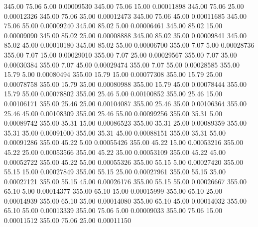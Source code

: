     345.00     75.06      5.00     0.00009530
    345.00     75.06     15.00     0.00011898
    345.00     75.06     25.00     0.00012326
    345.00     75.06     35.00     0.00012473
    345.00     75.06     45.00     0.00011685
    345.00     75.06     55.00     0.00009240
    345.00     85.02      5.00     0.00006461
    345.00     85.02     15.00     0.00009090
    345.00     85.02     25.00     0.00008888
    345.00     85.02     35.00     0.00009841
    345.00     85.02     45.00     0.00010180
    345.00     85.02     55.00     0.00006700
    355.00      7.07      5.00     0.00028736
    355.00      7.07     15.00     0.00029010
    355.00      7.07     25.00     0.00029567
    355.00      7.07     35.00     0.00030384
    355.00      7.07     45.00     0.00029474
    355.00      7.07     55.00     0.00028585
    355.00     15.79      5.00     0.00080494
    355.00     15.79     15.00     0.00077308
    355.00     15.79     25.00     0.00078758
    355.00     15.79     35.00     0.00080988
    355.00     15.79     45.00     0.00078444
    355.00     15.79     55.00     0.00078802
    355.00     25.46      5.00     0.00100852
    355.00     25.46     15.00     0.00106171
    355.00     25.46     25.00     0.00104087
    355.00     25.46     35.00     0.00106364
    355.00     25.46     45.00     0.00108309
    355.00     25.46     55.00     0.00099256
    355.00     35.31      5.00     0.00089742
    355.00     35.31     15.00     0.00086523
    355.00     35.31     25.00     0.00089359
    355.00     35.31     35.00     0.00091000
    355.00     35.31     45.00     0.00088151
    355.00     35.31     55.00     0.00091286
    355.00     45.22      5.00     0.00055426
    355.00     45.22     15.00     0.00053216
    355.00     45.22     25.00     0.00053566
    355.00     45.22     35.00     0.00053109
    355.00     45.22     45.00     0.00052722
    355.00     45.22     55.00     0.00055326
    355.00     55.15      5.00     0.00027420
    355.00     55.15     15.00     0.00027849
    355.00     55.15     25.00     0.00027961
    355.00     55.15     35.00     0.00027121
    355.00     55.15     45.00     0.00026176
    355.00     55.15     55.00     0.00026667
    355.00     65.10      5.00     0.00014377
    355.00     65.10     15.00     0.00015999
    355.00     65.10     25.00     0.00014939
    355.00     65.10     35.00     0.00014080
    355.00     65.10     45.00     0.00014032
    355.00     65.10     55.00     0.00013339
    355.00     75.06      5.00     0.00009033
    355.00     75.06     15.00     0.00011512
    355.00     75.06     25.00     0.00011150
